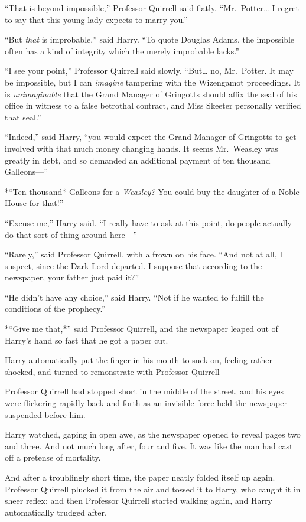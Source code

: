 ``That is beyond impossible,'' Professor Quirrell said flatly.
``Mr.~Potter\ldots{} I regret to say that this young lady expects to
marry you.''

``But \emph{that} is improbable,'' said Harry. ``To quote Douglas Adams,
the impossible often has a kind of integrity which the merely improbable
lacks.''

``I see your point,'' Professor Quirrell said slowly. ``But\ldots{} no,
Mr.~Potter. It may be impossible, but I can \emph{imagine} tampering
with the Wizengamot proceedings. It is \emph{unimaginable} that the
Grand Manager of Gringotts should affix the seal of his office in
witness to a false betrothal contract, and Miss Skeeter personally
verified that seal.''

``Indeed,'' said Harry, ``you would expect the Grand Manager of
Gringotts to get involved with that much money changing hands. It seems
Mr.~Weasley was greatly in debt, and so demanded an additional payment
of ten thousand Galleons---''

*``Ten thousand* Galleons for a \emph{Weasley?} You could buy the
daughter of a Noble House for that!''

``Excuse me,'' Harry said. ``I really have to ask at this point, do
people actually do that sort of thing around here---''

``Rarely,'' said Professor Quirrell, with a frown on his face. ``And not
at all, I suspect, since the Dark Lord departed. I suppose that
according to the newspaper, your father just paid it?''

``He didn't have any choice,'' said Harry. ``Not if he wanted to fulfill
the conditions of the prophecy.''

*``Give me that,*'' said Professor Quirrell, and the newspaper leaped
out of Harry's hand so fast that he got a paper cut.

Harry automatically put the finger in his mouth to suck on, feeling
rather shocked, and turned to remonstrate with Professor Quirrell---

Professor Quirrell had stopped short in the middle of the street, and
his eyes were flickering rapidly back and forth as an invisible force
held the newspaper suspended before him.

Harry watched, gaping in open awe, as the newspaper opened to reveal
pages two and three. And not much long after, four and five. It was like
the man had cast off a pretense of mortality.

And after a troublingly short time, the paper neatly folded itself up
again. Professor Quirrell plucked it from the air and tossed it to
Harry, who caught it in sheer reflex; and then Professor Quirrell
started walking again, and Harry automatically trudged after.

